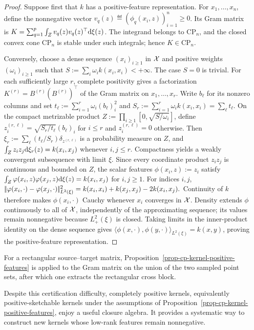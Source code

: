 \begin{proof}
Suppose first that \(k\) has a positive-feature representation. For \(x_1,\ldots,x_n\), define the nonnegative vector \(v_q(z)\eqdef(\phi_q(x_i,z))_{i=1}^n\geq0\). Its Gram matrix is \(K=\sum_{q=1}^p\int_Z v_q(z)v_q(z)^\top\mathrm{d}\xi(z)\).
The integrand belongs to \(\mathrm{CP}_n\), and the closed convex cone \(\mathrm{CP}_n\) is stable under such integrals; hence \(K\in\mathrm{CP}_n\).

Conversely, choose a dense sequence \((x_i)_{i\geq1}\) in \(\mathcal{X}\) and positive weights \((\omega_i)_{i\geq1}\) such that \(S:=\sum_i\omega_i k(x_i,x_i)<+\infty\). The case \(S=0\) is trivial. For each sufficiently large \(r\), complete positivity gives a factorization \(K^{(r)}=B^{(r)}(B^{(r)})^\top\) of the Gram matrix on \(x_1,\ldots,x_r\). Write \(b_\ell\) for its nonzero columns and set \(t_\ell:=\sum_{i=1}^r\omega_i(b_\ell)_i^2\) and \(S_r:=\sum_{i=1}^r\omega_i k(x_i,x_i)=\sum_\ell t_\ell\). On the compact metrizable product \(Z:=\prod_{i\geq1}[0,\sqrt{S/\omega_i}]\), define \(z^{(r,\ell)}_i=\sqrt{S_r/t_\ell}(b_\ell)_i\) for \(i\leq r\) and \(z^{(r,\ell)}_i=0\) otherwise. Then \(\xi_r:=\sum_\ell(t_\ell/S_r)\delta_{z^{(r,\ell)}}\) is a probability measure on \(Z\), and \(\int_Zz_i z_j\mathrm{d}\xi_r(z)=k(x_i,x_j)\) whenever \(i,j\leq r\). Compactness yields a weakly convergent subsequence with limit \(\xi\). Since every coordinate product \(z_i z_j\) is continuous and bounded on \(Z\), the scalar features \(\phi(x_i,z):=z_i\) satisfy \(\int_Z\varphi(x_i,z)\varphi(x_j,z)\mathrm{d}\xi(z)=k(x_i,x_j)\) for \(i,j\geq1\).
For indices \(i,j\), \(|\!| \varphi(x_i,\cdot)-\varphi(x_j,\cdot) |\!|_{L^2(\xi)}^2 =k(x_i,x_i)+k(x_j,x_j)-2k(x_i,x_j).\)
Continuity of \(k\) therefore makes \(\phi(x_i,\cdot)\) Cauchy whenever \(x_i\) converges in \(\mathcal{X}\). Density extends \(\phi\) continuously to all of \(\mathcal{X}\), independently of the approximating sequence; its values remain nonnegative because \(L^2_+(\xi)\) is closed. Taking limits in the inner-product identity on the dense sequence gives \(\langle\phi(x,\cdot),\phi(y,\cdot)\rangle_{L^2(\xi)}=k(x,y)\), proving the positive-feature representation.
\end{proof}
For a rectangular source--target matrix, Proposition~\ref{prop-cp-kernel-positive-features} is applied to the Gram matrix on the union of the two sampled point sets, after which one extracts the rectangular cross block.

Despite this certification difficulty, completely positive kernels, equivalently positive-sketchable kernels under the assumptions of Proposition~\ref{prop-cp-kernel-positive-features}, enjoy a useful closure algebra. It provides a systematic way to construct new kernels whose low-rank features remain nonnegative.

